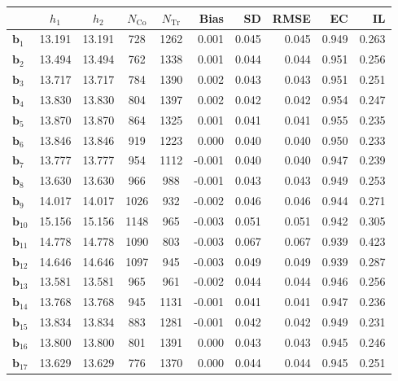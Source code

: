 \documentclass[10pt]{article}
\newcommand{\bb}{\mathbf{b}}
\begin{document}
\begin{table}[p]
    \caption{Intention-to-Treat Effects (Simulations, $s=1$, ITT Bandwidth Selector).}
    \label{tab:sa-simuls-itt-s1}
\end{table}

\begin{table}[p]
    \centering
\begin{tabular}{lccccrrrrr}
\toprule\toprule
 & $h_1$ & $h_2$ & $N_{\mathrm{Co}}$ & $N_{\mathrm{Tr}}$ & Bias & SD & RMSE & EC & IL \\
\midrule
$\bb_{1}$ & 13.191 & 13.191 & 728 & 1262 & 0.001 & 0.045 & 0.045 & 0.949 & 0.263 \\
$\bb_{2}$ & 13.494 & 13.494 & 762 & 1338 & 0.001 & 0.044 & 0.044 & 0.951 & 0.256 \\
$\bb_{3}$ & 13.717 & 13.717 & 784 & 1390 & 0.002 & 0.043 & 0.043 & 0.951 & 0.251 \\
$\bb_{4}$ & 13.830 & 13.830 & 804 & 1397 & 0.002 & 0.042 & 0.042 & 0.954 & 0.247 \\
$\bb_{5}$ & 13.870 & 13.870 & 864 & 1325 & 0.001 & 0.041 & 0.041 & 0.955 & 0.235 \\
$\bb_{6}$ & 13.846 & 13.846 & 919 & 1223 & 0.000 & 0.040 & 0.040 & 0.950 & 0.233 \\
$\bb_{7}$ & 13.777 & 13.777 & 954 & 1112 & -0.001 & 0.040 & 0.040 & 0.947 & 0.239 \\
$\bb_{8}$ & 13.630 & 13.630 & 966 & 988 & -0.001 & 0.043 & 0.043 & 0.949 & 0.253 \\
$\bb_{9}$ & 14.017 & 14.017 & 1026 & 932 & -0.002 & 0.046 & 0.046 & 0.944 & 0.271 \\
$\bb_{10}$ & 15.156 & 15.156 & 1148 & 965 & -0.003 & 0.051 & 0.051 & 0.942 & 0.305 \\
$\bb_{11}$ & 14.778 & 14.778 & 1090 & 803 & -0.003 & 0.067 & 0.067 & 0.939 & 0.423 \\
$\bb_{12}$ & 14.646 & 14.646 & 1097 & 945 & -0.003 & 0.049 & 0.049 & 0.939 & 0.287 \\
$\bb_{13}$ & 13.581 & 13.581 & 965 & 961 & -0.002 & 0.044 & 0.044 & 0.946 & 0.256 \\
$\bb_{14}$ & 13.768 & 13.768 & 945 & 1131 & -0.001 & 0.041 & 0.041 & 0.947 & 0.236 \\
$\bb_{15}$ & 13.834 & 13.834 & 883 & 1281 & -0.001 & 0.042 & 0.042 & 0.949 & 0.231 \\
$\bb_{16}$ & 13.800 & 13.800 & 801 & 1391 & 0.000 & 0.043 & 0.043 & 0.945 & 0.246 \\
$\bb_{17}$ & 13.629 & 13.629 & 776 & 1370 & 0.000 & 0.044 & 0.044 & 0.945 & 0.251 \\

\end{tabular}
\end{table}
\end{document}
